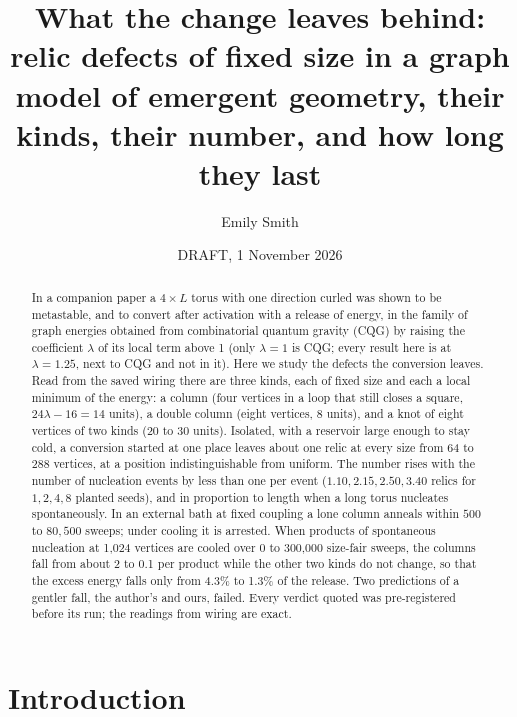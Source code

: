 \documentclass[aps,pre,10pt,twocolumn,superscriptaddress,nofootinbib]{revtex4-2}
\begin{document}
\title{What the change leaves behind: relic defects of fixed size in a graph model of emergent geometry, their
kinds, their number, and how long they last}

\author{Emily Smith}

\date{DRAFT, 1 November 2026}

\begin{abstract}
In a companion paper a $4 \times L$ torus with one direction curled was shown to be metastable, and to convert
after activation with a release of energy, in the family of graph energies obtained from combinatorial quantum
gravity (CQG) by raising the coefficient $\lambda$ of its local term above 1 (only $\lambda = 1$ is CQG; every
result here is at $\lambda = 1.25$, next to CQG and not in it). Here we study the defects the conversion leaves.
Read from the saved wiring there are three kinds, each of fixed size and each a local minimum of the energy: a
column (four vertices in a loop that still closes a square, $24\lambda - 16 = 14$ units), a double column (eight
vertices, 8 units), and a knot of eight vertices of two kinds (20 to 30 units). Isolated, with a reservoir large
enough to stay cold, a conversion started at one place leaves about one relic at every size from 64 to 288
vertices, at a position indistinguishable from uniform. The number rises with the number of nucleation events
by less than one per event ($1.10, 2.15, 2.50, 3.40$ relics for $1, 2, 4, 8$ planted seeds), and in proportion
to length when a long torus nucleates spontaneously. In an external bath at fixed coupling a lone column anneals
within $500$ to $80{,}500$ sweeps; under cooling it is arrested. When products of spontaneous nucleation at
1,024 vertices are cooled over 0 to 300,000 size-fair sweeps, the columns fall from about 2 to 0.1 per product while
the other two kinds do not change, so that the excess energy falls only from 4.3\% to 1.3\% of the release. Two
predictions of a gentler fall, the author's and ours, failed. Every verdict quoted was pre-registered before
its run; the readings from wiring are exact.
\end{abstract}

\maketitle

\section{Introduction}
\end{document}
